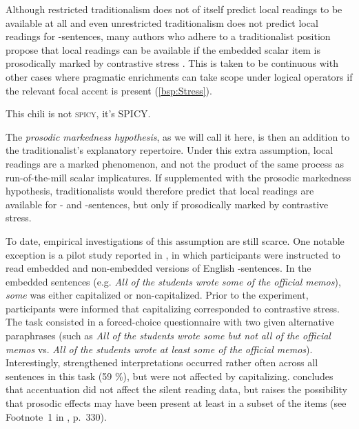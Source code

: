 \documentclass[fleqn,reqno,10pt]{article}
\newcommand{\as}{\acro{as}}
\renewcommand{\es}{\acro{es}}
\begin{document}
Although restricted traditionalism does not of itself predict local
readings to be available at all and even unrestricted traditionalism
does not predict local readings for \es-sentences, many authors who
adhere to a traditionalist position propose that local readings can be
available if the embedded scalar item is prosodically marked by
contrastive stress
\citep[e.g.][]{Horn2006:The-Border-Wars,Geurts2009:Scalar-Implicat,Geurts2010:Quantity-Implic,GeurtsTielvan-Tiel2013:Embedded-Scalar}. This
is taken to be continuous with other cases where pragmatic enrichments
can take scope under logical operators if the relevant focal accent is
present (\ref{bsp:Stress}).

\begin{exe}
\ex \label{bsp:Stress} This chili is not \textsc{spicy}, it's \textsc{SPICY}.
\end{exe}

\noindent The \emph{prosodic markedness hypothesis}, as we will call
it here, is then an addition to the traditionalist's explanatory
repertoire. Under this extra assumption, local readings are a marked
phenomenon, and not the product of the same process as run-of-the-mill
scalar implicatures. If supplemented with the prosodic markedness
hypothesis, traditionalists would therefore predict that local
readings are available for \as- and \es-sentences, but only if
prosodically marked by contrastive stress.

To date, empirical investigations of this assumption are still scarce.  One
notable exception is a pilot study reported in
\citet{Frazier08}, in which participants were instructed to read
embedded and non-embedded versions of English \as-sentences. In the
embedded sentences (e.g. {\it All of the students wrote some of the
  official memos}), {\it some} was either capitalized or
non-capitalized. Prior to the experiment, participants were informed
that capitalizing corresponded to contrastive stress. The task
consisted in a forced-choice questionnaire with two given alternative
paraphrases  (such as {\it All of the students wrote some but not all of the
  official memos} vs. {\it All of the students wrote at least some of
  the official memos}). Interestingly, strengthened interpretations
occurred rather often across all sentences in this task (59 \%), but
were not affected by capitalizing.
\citeauthor{Frazier08} concludes that accentuation did not affect the
silent reading data, but raises the possibility that prosodic effects
may have been present at least in a subset of the items (see
Footnote~1 in \citet{Frazier08}, p.~330).
\end{document}
